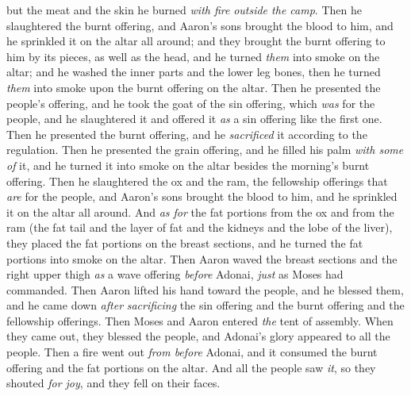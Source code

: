 \begin{biblechapter}
\verse but the meat and the skin he burned \textit{with fire} \textit{outside the camp}.
\verse Then he slaughtered the burnt offering, and Aaron’s sons brought the blood to him, and he sprinkled it on the altar all around;
\verse and they brought the burnt offering to him by its pieces, as well as the head, and he turned \textit{them} into smoke on the altar;
\verse and he washed the inner parts and the lower leg bones, then he turned \textit{them} into smoke upon the burnt offering on the altar.
\verse Then he presented the people’s offering, and he took the goat of the sin offering, which \textit{was} for the people, and he slaughtered it and offered it \textit{as} a sin offering like the first one.
\verse Then he presented the burnt offering, and he \textit{sacrificed} it according to the regulation.
\verse Then he presented the grain offering, and he filled his palm \textit{with some of} it, and he turned it into smoke on the altar besides the morning’s burnt offering.
\verse Then he slaughtered the ox and the ram, the fellowship offerings that \textit{are} for the people, and Aaron’s sons brought the blood to him, and he sprinkled it on the altar all around.
\verse And \textit{as for} the fat portions from the ox and from the ram (the fat tail and the layer of fat and the kidneys and the lobe of the liver),
\verse they placed the fat portions on the breast sections, and he turned the fat portions into smoke on the altar.
\verse Then Aaron waved the breast sections and the right upper thigh \textit{as} a wave offering \textit{before} Adonai, \textit{just} as Moses had commanded.
\verse Then Aaron lifted his hand toward the people, and he blessed them, and he came down \textit{after} \textit{sacrificing} the sin offering and the burnt offering and the fellowship offerings.
\verse Then Moses and Aaron entered \textit{the} tent of assembly. When they came out, they blessed the people, and Adonai’s glory appeared to all the people.
\verse Then a fire went out \textit{from before} Adonai, and it consumed the burnt offering and the fat portions on the altar. And all the people saw \textit{it}, so they shouted \textit{for joy}, and they fell on their faces.
\end{biblechapter}

